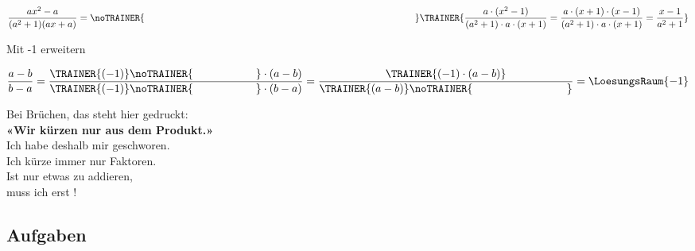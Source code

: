 \begin{beispiel}{}{}
$$\frac{ax^2 - a}{(a^2+1)(ax+a)} = \noTRAINER{\hspace{10cm}}\TRAINER{\frac{a\cdot{}(x^2-1)}{(a^2+1)\cdot{}a\cdot{}(x+1)}=\frac{a\cdot{}(x+1)\cdot{}(x-1)}{(a^2+1)\cdot{}a\cdot{}(x+1)}=\frac{x-1}{a^2+1}} $$
\end{beispiel}


\begin{beispiel}{Mit -1 erweitern}{}

$$\frac{a-b}{b-a} = \frac{\TRAINER{(-1)}\noTRAINER{\hspace{20mm}}\cdot(a-b)}{\TRAINER{(-1)}\noTRAINER{\hspace{20mm}}\cdot(b-a)}
= \frac{\TRAINER{(-1)\cdot(a-b)}}{\TRAINER{(a-b)}\noTRAINER{\hspace{30mm}}} = \LoesungsRaum{-1}$$
\end{beispiel}


\begin{rezept}{}{}

\begin{center}Bei Brüchen, das steht hier gedruckt:\\
\textbf{«Wir kürzen nur aus dem Produkt.»}\\

Ich habe deshalb mir geschworen.\\
Ich kürze immer nur Faktoren.\\

Ist nur etwas zu addieren,\noTRAINER{\vspace{5mm}}\\
muss ich erst \noTRAINER{\hspace{5cm}}!\\
\end{center}
\end{rezept}



\subsection*{Aufgaben}
%
%

